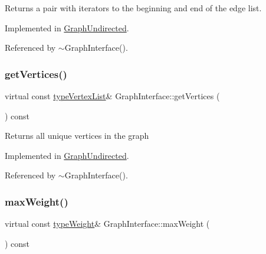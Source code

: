 \begin{DoxyReturn}{Returns}
a pair with iterators to the beginning and end of the edge list. 
\end{DoxyReturn}


Implemented in \hyperlink{classGraphUndirected_aa6fa3435fb456f1a7e9642b631878431}{Graph\+Undirected}.



Referenced by $\sim$\+Graph\+Interface().

\mbox{\label{classGraphInterface_a94af429415c22cba42ecf5a97ee6b5c3}} 
\subsubsection{\texorpdfstring{get\+Vertices()}{getVertices()}}
{\footnotesize\ttfamily virtual const \hyperlink{graphInterface_8h_a21d54d8a139def524d3b0d6f71ec4974}{type\+Vertex\+List}\& Graph\+Interface\+::get\+Vertices (\begin{DoxyParamCaption}{ }\end{DoxyParamCaption}) const\hspace{0.3cm}{\ttfamily [pure virtual]}}

\begin{DoxyReturn}{Returns}
all unique vertices in the graph 
\end{DoxyReturn}


Implemented in \hyperlink{classGraphUndirected_af2f65109919c878a1fd7637d3bfe0991}{Graph\+Undirected}.



Referenced by $\sim$\+Graph\+Interface().

\mbox{\label{classGraphInterface_a2fb0681f6cda5f8318adf7ee95df3685}} 
\subsubsection{\texorpdfstring{max\+Weight()}{maxWeight()}}
{\footnotesize\ttfamily virtual const \hyperlink{edge_8h_a2e7ea3be891ac8b52f749ec73fee6dd2}{type\+Weight}\& Graph\+Interface\+::max\+Weight (\begin{DoxyParamCaption}{ }\end{DoxyParamCaption}) const\hspace{0.3cm}{\ttfamily [pure virtual]}}

